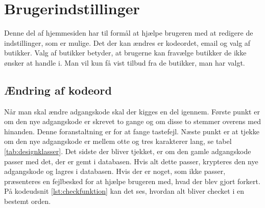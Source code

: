 \section{Brugerindstillinger}
Denne del af hjemmesiden har til formål at hjælpe brugeren med at redigere de indstillinger, som er mulige. Det der kan ændres er kodeordet, email og valg af butikker. Valg af butikker betyder, at brugerne kan fravælge butikker de ikke ønsker at handle i. Man vil kun få vist tilbud fra de butikker, man har valgt.

\subsection{Ændring af kodeord}
Når man skal ændre adgangskode skal der kigges en del igennem. Første punkt er om den nye adgangskode er skrevet to gange og om disse to stemmer overens med hinanden. Denne foranstaltning er for at fange tastefejl. Næste punkt er at tjekke om den nye adgangskode er mellem otte og tres karakterer lang, se tabel \ref{tab:designklasser}. Det sidste der bliver tjekket, er om den gamle adgangskode passer med det, der er gemt i databasen. Hvis alt dette passer, krypteres den nye adgangskode og lagres i databasen. Hvis der er noget, som ikke passer, præsenteres en fejlbesked for at hjælpe brugeren med, hvad der blev gjort forkert. På kodeudsnit \ref{lst:checkfunktion} kan det ses, hvordan alt bliver checket i en bestemt orden.

